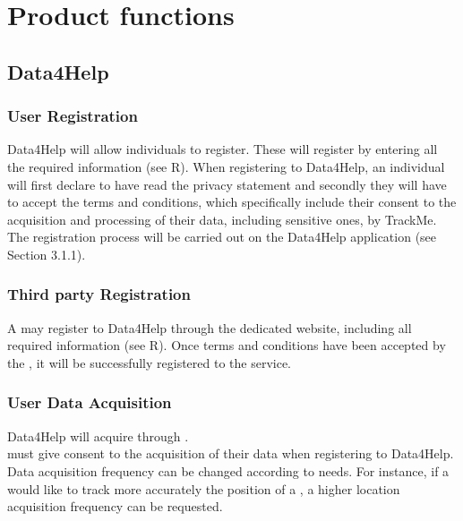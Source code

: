 \documentclass[../../rasd.tex]{subfiles}
\begin{document}
\section{Product functions}
			\subsection{Data4Help}
			
				\subsubsection{User Registration}
				Data4Help will allow individuals to register. These will register by entering all the required information (see R). When registering to Data4Help, an individual will first declare to have read the privacy statement and secondly they will have to accept the terms and conditions, which specifically include their consent to the acquisition and processing of their data, including sensitive ones, by TrackMe.\\
				The  registration process will be carried out on the Data4Help application (see Section 3.1.1).\\
			
				\subsubsection{Third party Registration}
				A  may register to Data4Help through the  dedicated website, including all required information (see R).
				Once terms and conditions have been accepted by the , it will be successfully registered to the service.\\
							
				\subsubsection{User Data Acquisition}
				Data4Help will acquire  through . \\
				 must give consent to the acquisition of their data when registering to Data4Help.\\
				Data acquisition frequency can be changed according to  needs. For instance, if a  would like to track more accurately the position of a , a higher location acquisition frequency can be requested.
\end{document}
